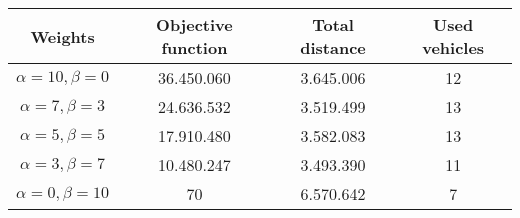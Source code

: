 {
\renewcommand{\arraystretch}{2}
\begin{longtable}[h]{| c | c | c | c |}
    \hline
    \textbf{Weights} & \textbf{Objective function} & \textbf{Total distance} & \textbf{Used vehicles} \\
    \hline
    \endhead
    $\alpha = 10, \beta = 0$ & 36.450.060 & 3.645.006 & 12 \\
    \hline
    $\alpha = 7, \beta = 3$  & 24.636.532 & 3.519.499 & 13 \\
    \hline
    $\alpha = 5, \beta = 5$  & 17.910.480 & 3.582.083 & 13 \\
    \hline
    $\alpha = 3, \beta = 7$  & 10.480.247 & 3.493.390 & 11 \\
    \hline
    $\alpha = 0, \beta = 10$ &         70 & 6.570.642 &  7 \\
    \hline
\end{longtable}
}
